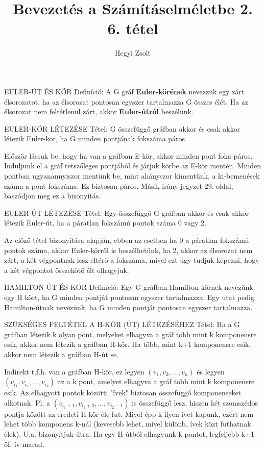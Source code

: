 \documentclass[]{article}
\title{Bevezetés a Számításelméletbe 2.\\{\large 6. tétel}}
\author{Hegyi Zsolt}
\begin{document}
\maketitle
\begin{shaded}
EULER-ÚT ÉS KÖR Definíció: A G gráf \textbf{Euler-körének} nevezzük egy zárt élsorozatot, ha az élsorozat pontosan egyszer tartalmazza G összes élét. Ha az élsorozat nem feltétlenül zárt, akkor \textbf{Euler-útról} beszélünk.
\end{shaded}
\begin{framed}
EULER-KÖR LÉTEZÉSE Tétel: G összefüggő gráfban akkor és csak akkor létezik Euler-kör, ha G minden pontjának fokszáma páros.
\end{framed}
\begin{leftbar}
Először lássuk be, hogy ha van a gráfban E-kör, akkor minden pont foka páros. Induljunk el a gráf tetszőleges pontjából és járjuk körbe az E-kör mentén. Minden pontban ugyanannyiszor mentünk be, mint ahányszor kimentünk, a ki-bemenések száma a pont fokszáma. Ez biztosan páros. Másik irány jegyzet 29. oldal, baszódjon meg ez a bizonyítás.
\end{leftbar}
\begin{framed}
EULER-ÚT LÉTEZÉSE Tétel: Egy összefüggő G gráfban akkor és csak akkor létezik Euler-út, ha a páratlan fokszámú pontok száma 0 vagy 2.
\end{framed}
\begin{leftbar}
Az előző tétel bizonyítása alapján, ebben az esetben ha 0 a páratlan fokszámú pontok száma, akkor Euler-körről is beszélhetünk, ha 2, akkor az élsorozat nem zárt, a két végpontnak lesz eltérő a fokszáma, mivel ezt úgy tudjuk képezni, hogy a két végpontot összekötő élt elhagyjuk.
\end{leftbar}
\begin{shaded}
HAMILTON-ÚT ÉS KÖR Definíció: Egy G gráfban Hamilton-körnek nevezünk egy H kört, ha G minden pontját pontosan egyszer tartalmazza. Egy utat pedig Hamilton-útnak nevezünk, ha G minden pontját pontosan egyszer tartalmazza.
\end{shaded}
\begin{framed}
SZÜKSÉGES FELTÉTEL A H-KÖR (ÚT) LÉTEZÉSÉHEZ Tétel: Ha a G gráfban létezik k olyan pont, melyeket elhagyva a gráf több mint k komponensre esik, akkor nem létezik a gráfban H-kör. Ha több, mint k+1 komponensre esik, akkor nem létezik a gráfban H-út se.
\end{framed}
\begin{leftbar}
Indirekt t.f.h. van a gráfban H-kör, ez legyen $(v_1, v_2,..., v_n)$ és legyen $(v_{i_1}, v_{i_2},...,v_{i_k})$ az a k pont, amelyet elhagyva a gráf több mint k komponensre esik. Az elhagyott pontok közötti "ívek" biztosan összefüggő komponenseket alkotnak. Pl. a $(v_{i_{1}+1}, v_{i_{1}+2},..., v_{i_{2}-1})$ is összefüggő lesz, hiszen két szomszédos pontja között az eredeti H-kör éle fut. Mivel épp k ilyen ívet kapunk, ezért nem lehet több komponens k-nál (kevesebb lehet, mivel különb. ívek közt futhatnak élek). U.a. bizonyítjuk útra. Ha egy H-útból elhagyunk k pontot, legfeljebb k+1 öf. ív marad.
\end{leftbar}
\end{document}
